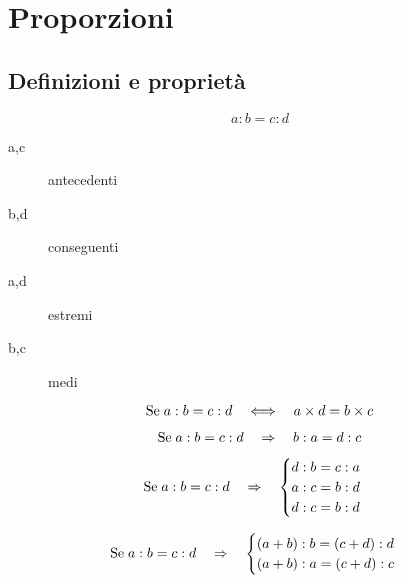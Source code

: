 \chapter{Proporzioni}
\section{Definizioni e proprietà}
\begin{defn}[Vocabolario]
\[a:b=c:d\]
\begin{description}
	\item[a,c] antecedenti
	\item[b,d] conseguenti
	\item[a,d] estremi
	\item[b,c] medi
\end{description}
\end{defn}
\begin{prop}
\begin{equation*}                       
\text{Se\;}a:b=c:d\quad\Longleftrightarrow\quad a\times d=b\times c
\end{equation*}
\end{prop}
\begin{prop}
	\begin{equation*}                       
	\text{Se\;}a:b=c:d\quad\Rightarrow\quad  b:a=d:c
	\end{equation*}
\end{prop}
\begin{prop}
	\begin{equation*}                       
	\text{Se\;}a:b=c:d\quad\Rightarrow\quad \begin{cases}
	d:b=c:a\\
	a:c=b:d\\
	d:c=b:d
	\end{cases}
	\end{equation*}
\end{prop}
\begin{prop}
	\begin{equation*}                       
	\text{Se\;}a:b=c:d\quad\Rightarrow\quad \begin{cases}
	(a+b):b=(c+d):d\\
	(a+b):a=(c+d):c
	\end{cases}
	\end{equation*}
\end{prop}
